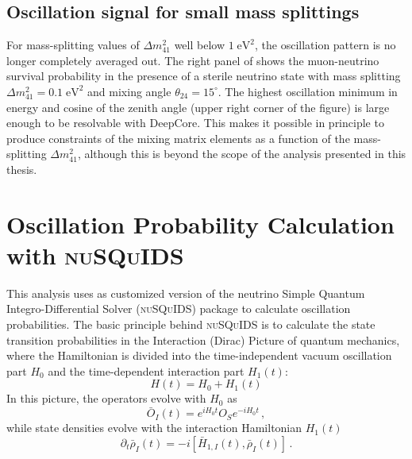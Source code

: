 \subsection{Oscillation signal for small mass splittings}
For mass-splitting values of $\Delta m^2_{41}$ well below $1\;\mathrm{eV^2}$, the oscillation pattern is no longer completely averaged out. The right panel of  shows the muon-neutrino survival probability in the presence of a sterile neutrino state with mass splitting $\Delta m^2_{41}=0.1\;\mathrm{eV^2}$ and mixing angle $\theta_{24}=15^\circ$. The highest oscillation minimum in energy and cosine of the zenith angle (upper right corner of the figure) is large enough to be resolvable with DeepCore. This makes it possible in principle to produce constraints of the mixing matrix elements as a function of the mass-splitting $\Delta m^2_{41}$, although this is beyond the scope of the analysis presented in this thesis.

\section{Oscillation Probability Calculation with \textsc{nuSQuIDS}}
\label{sec:nusquids}

This analysis uses as customized version of the neutrino Simple Quantum Integro-Differential Solver (\textsc{nuSQuIDS})\cite{squids, nusquids} package to calculate oscillation probabilities. The basic principle behind \textsc{nuSQuIDS} is to calculate the state transition probabilities in the Interaction (Dirac) Picture of quantum mechanics, where the Hamiltonian is divided into the time-independent vacuum oscillation part $H_0$ and the time-dependent interaction part $ H_1(t)$:
\begin{equation}
    H(t) = H_0 + H_1(t)
\end{equation}
In this picture, the operators evolve with $ H_0$ as
\begin{equation}
\bar{O}_I(t)=e^{iH_0t}O_Se^{-iH_0t}\,,
\end{equation}
while state densities evolve with the interaction Hamiltonian $ H_1(t)$
\begin{equation}
\partial_t\bar{\rho}_I(t)=-i[\bar{H}_{1, I}(t), \bar{\rho}_I(t)]\,.
\end{equation}

